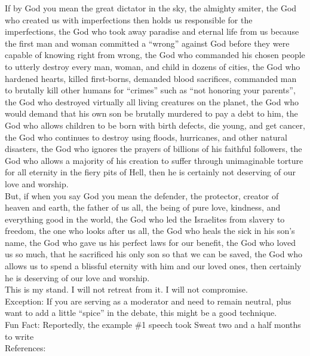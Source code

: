 \documentclass[a4paper,12pt,single,pdftex]{scrartcl}
\begin{document}
    
      If by God you mean the great dictator in the sky, the almighty smiter, the God who created us with imperfections then holds us responsible for the imperfections, the God who took away paradise and eternal life from us because the first man and woman committed a “wrong” against God before they were capable of knowing right from wrong, the God who commanded his chosen people to utterly destroy every man, woman, and child in dozens of cities, the God who hardened hearts, killed first-borns, demanded blood sacrifices, commanded man to brutally kill other humans for “crimes” such as “not honoring your parents”, the God who destroyed virtually all living creatures on the planet, the God who would demand that his own son be brutally murdered to pay a debt to him, the God who allows children to be born with birth defects, die young, and get cancer, the God who continues to destroy using floods, hurricanes, and other natural disasters, the God who ignores the prayers of billions of his faithful followers, the God who allows a majority of his creation to suffer through unimaginable torture for all eternity in the fiery pits of Hell, then he is certainly not deserving of our love and worship.
    \\

    
      But, if when you say God you mean the defender, the protector, creator of heaven and earth, the father of us all, the being of pure love, kindness, and everything good in the world, the God who led the Israelites from slavery to freedom, the one who looks after us all, the God who heals the sick in his son’s name, the God who gave us his perfect laws for our benefit, the God who loved us so much, that he sacrificed his only son so that we can be saved, the God who allows us to spend a blissful eternity with him and our loved ones, then certainly he is deserving of our love and worship.
    \\

    
      This is my stand. I will not retreat from it. I will not compromise.
    \\

    
      Exception: If you are serving as a moderator and need to remain neutral, plus want to add a little “spice” in the debate, this might be a good technique.
    \\

    
      Fun Fact: Reportedly, the example \#1 speech took Sweat two and a half months to write
    \\

    References:
\end{document}
